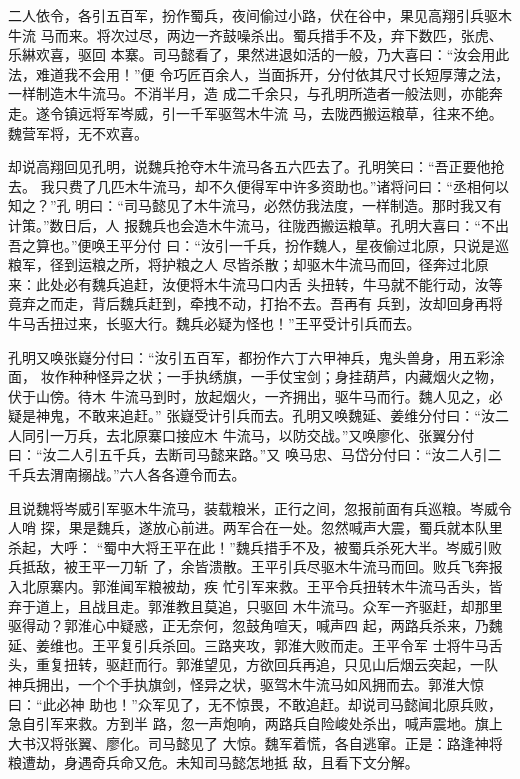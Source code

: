 二人依令，各引五百军，扮作蜀兵，夜间偷过小路，伏在谷中，果见高翔引兵驱木牛流
马而来。将次过尽，两边一齐鼓噪杀出。蜀兵措手不及，弃下数匹，张虎、乐綝欢喜，驱回
本寨。司马懿看了，果然进退如活的一般，乃大喜曰：“汝会用此法，难道我不会用！”便
令巧匠百余人，当面拆开，分付依其尺寸长短厚薄之法，一样制造木牛流马。不消半月，造
成二千余只，与孔明所造者一般法则，亦能奔走。遂令镇远将军岑威，引一千军驱驾木牛流
马，去陇西搬运粮草，往来不绝。魏营军将，无不欢喜。

却说高翔回见孔明，说魏兵抢夺木牛流马各五六匹去了。孔明笑曰：“吾正要他抢去。
我只费了几匹木牛流马，却不久便得军中许多资助也。”诸将问曰：“丞相何以知之？”孔
明曰：“司马懿见了木牛流马，必然仿我法度，一样制造。那时我又有计策。”数日后，人
报魏兵也会造木牛流马，往陇西搬运粮草。孔明大喜曰：“不出吾之算也。”便唤王平分付
曰：“汝引一千兵，扮作魏人，星夜偷过北原，只说是巡粮军，径到运粮之所，将护粮之人
尽皆杀散；却驱木牛流马而回，径奔过北原来：此处必有魏兵追赶，汝便将木牛流马口内舌
头扭转，牛马就不能行动，汝等竟弃之而走，背后魏兵赶到，牵拽不动，打抬不去。吾再有
兵到，汝却回身再将牛马舌扭过来，长驱大行。魏兵必疑为怪也！”王平受计引兵而去。

孔明又唤张嶷分付曰：“汝引五百军，都扮作六丁六甲神兵，鬼头兽身，用五彩涂面，
妆作种种怪异之状；一手执绣旗，一手仗宝剑；身挂葫芦，内藏烟火之物，伏于山傍。待木
牛流马到时，放起烟火，一齐拥出，驱牛马而行。魏人见之，必疑是神鬼，不敢来追赶。”
张嶷受计引兵而去。孔明又唤魏延、姜维分付曰：“汝二人同引一万兵，去北原寨口接应木
牛流马，以防交战。”又唤廖化、张翼分付曰：“汝二人引五千兵，去断司马懿来路。”又
唤马忠、马岱分付曰：“汝二人引二千兵去渭南搦战。”六人各各遵令而去。

且说魏将岑威引军驱木牛流马，装载粮米，正行之间，忽报前面有兵巡粮。岑威令人哨
探，果是魏兵，遂放心前进。两军合在一处。忽然喊声大震，蜀兵就本队里杀起，大呼：
“蜀中大将王平在此！”魏兵措手不及，被蜀兵杀死大半。岑威引败兵抵敌，被王平一刀斩
了，余皆溃散。王平引兵尽驱木牛流马而回。败兵飞奔报入北原寨内。郭淮闻军粮被劫，疾
忙引军来救。王平令兵扭转木牛流马舌头，皆弃于道上，且战且走。郭淮教且莫追，只驱回
木牛流马。众军一齐驱赶，却那里驱得动？郭淮心中疑惑，正无奈何，忽鼓角喧天，喊声四
起，两路兵杀来，乃魏延、姜维也。王平复引兵杀回。三路夹攻，郭淮大败而走。王平令军
士将牛马舌头，重复扭转，驱赶而行。郭淮望见，方欲回兵再追，只见山后烟云突起，一队
神兵拥出，一个个手执旗剑，怪异之状，驱驾木牛流马如风拥而去。郭淮大惊曰：“此必神
助也！”众军见了，无不惊畏，不敢追赶。却说司马懿闻北原兵败，急自引军来救。方到半
路，忽一声炮响，两路兵自险峻处杀出，喊声震地。旗上大书汉将张翼、廖化。司马懿见了
大惊。魏军着慌，各自逃窜。正是：路逢神将粮遭劫，身遇奇兵命又危。未知司马懿怎地抵
敌，且看下文分解。